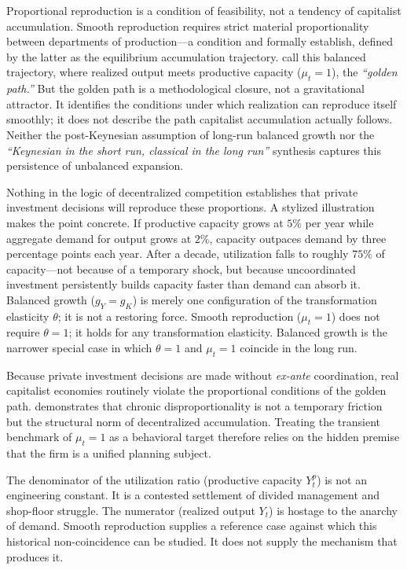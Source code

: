 Proportional reproduction is a condition of feasibility, not a
tendency of capitalist accumulation. Smooth reproduction requires
strict material proportionality between departments of
production---a condition \citet{Basu2022} and \citet{Okishio2022} formally establish, defined by the latter as the equilibrium accumulation trajectory. \citet{Bergmann2009} call
this balanced trajectory, where realized output meets productive
capacity ($\mu_t = 1$), the \textit{``golden path.''} But the golden path
is a methodological closure, not a gravitational attractor. It
identifies the conditions under which realization can reproduce
itself smoothly; it does not describe the path capitalist accumulation
actually follows. Neither the post-Keynesian assumption of long-run balanced
growth \citep{BleckerSetterfield2019} nor the \textit{``Keynesian in the short run, classical in the long run''} synthesis \citep{DumenilLevy1999} captures this persistence of unbalanced expansion.

Nothing in the logic of decentralized competition
establishes that private investment decisions will reproduce
these proportions. A stylized illustration makes the point
concrete. If productive capacity grows at $5\%$ per year while
aggregate demand for output grows at $2\%$, capacity outpaces
demand by three percentage points each year. After a decade,
utilization falls to roughly $75\%$ of capacity---not because
of a temporary shock, but because uncoordinated investment
persistently builds capacity faster than demand can absorb it.
Balanced growth ($g_Y = g_K$) is merely one configuration of
the transformation elasticity $\theta$; it is not a restoring
force. Smooth reproduction ($\mu_t = 1$) does not require
$\theta = 1$; it holds for any transformation elasticity.
Balanced growth is the narrower special case in which
$\theta = 1$ and $\mu_t = 1$ coincide in the long run.

Because private investment decisions are made without
\textit{ex-ante} coordination, real capitalist economies
routinely violate the proportional conditions of the golden path.
\citet{Okishio2022} demonstrates that chronic disproportionality
is not a temporary friction but the structural norm of
decentralized accumulation. Treating the transient benchmark of
$\mu_t = 1$ as a behavioral target therefore relies on the hidden
premise that the firm is a unified planning subject.

The denominator of the utilization ratio (productive capacity
$Y^p_t$) is not an engineering constant. It is a contested
settlement of divided management and shop-floor struggle. The
numerator (realized output $Y_t$) is hostage to the anarchy of
demand. Smooth reproduction supplies a reference case against
which this historical non-coincidence can be studied. It does not
supply the mechanism that produces it.

